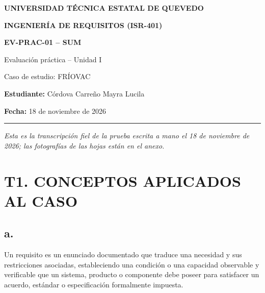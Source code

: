 \documentclass[11pt,a4paper]{article}
\begin{document}
\begin{center}
    {\Large\bfseries\color{verdeUTEQ}
    UNIVERSIDAD TÉCNICA ESTATAL DE QUEVEDO}

    \vspace{0.3cm}

    {\large\bfseries
    INGENIERÍA DE REQUISITOS (ISR-401)}

    \vspace{0.3cm}

    {\bfseries
    EV-PRAC-01 -- SUM}

    \vspace{0.2cm}

    Evaluación práctica -- Unidad I

    Caso de estudio: FRÍOVAC
\end{center}

\vspace{0.5cm}

\noindent
\textbf{Estudiante:}
Córdova Carreño Mayra Lucila

\noindent
\textbf{Fecha:}
18 de noviembre de 2026

\vspace{0.5cm}

\hrule

\vspace{0.5cm}



\noindent
\textit{Esta es la transcripción fiel de la prueba
escrita a mano el 18 de noviembre de 2026;
las fotografías de las hojas están en el anexo.}

\vspace{0.4cm}



\section*{T1. CONCEPTOS APLICADOS AL CASO}

\subsection*{a.} 

Un requisito es un enunciado documentado que traduce
una necesidad y sus restricciones asociadas,
estableciendo una condición o una capacidad
observable y verificable que un sistema, producto
o componente debe poseer para satisfacer un
acuerdo, estándar o especificación formalmente
impuesta.
\end{document}

